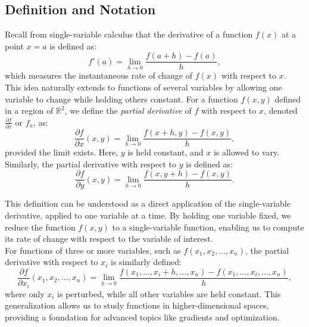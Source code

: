\subsection*{Definition and Notation}

\noindent Recall from single-variable calculus that the derivative of a function \( f(x) \) at a point \( x = a \) is defined as:
\[
f'(a) = \lim_{h \to 0} \frac{f(a + h) - f(a)}{h},
\]
which measures the instantaneous rate of change of \( f(x) \) with respect to \( x \). This idea naturally extends to functions of several variables by allowing one variable to change while holding others constant. For a function \( f(x, y) \) defined in a region of \( \mathbb{R}^2 \), we define the \textit{partial derivative} of \( f \) with respect to \( x \), denoted \( \frac{\partial f}{\partial x} \) or \( f_x \), as:
\[
\frac{\partial f}{\partial x}(x, y) = \lim_{h \to 0} \frac{f(x + h, y) - f(x, y)}{h},
\]
provided the limit exists. Here, \( y \) is held constant, and \( x \) is allowed to vary. Similarly, the partial derivative with respect to \( y \) is defined as:
\[
\frac{\partial f}{\partial y}(x, y) = \lim_{h \to 0} \frac{f(x, y + h) - f(x, y)}{h}.
\]

\noindent This definition can be understood as a direct application of the single-variable derivative, applied to one variable at a time. By holding one variable fixed, we reduce the function \( f(x, y) \) to a single-variable function, enabling us to compute its rate of change with respect to the variable of interest. \\

\noindent For functions of three or more variables, such as \( f(x_1, x_2, \ldots, x_n) \), the partial derivative with respect to \( x_i \) is similarly defined:
\[
\frac{\partial f}{\partial x_i}(x_1, x_2, \ldots, x_n) = \lim_{h \to 0} \frac{f(x_1, \ldots, x_i + h, \ldots, x_n) - f(x_1, \ldots, x_i, \ldots, x_n)}{h},
\]
where only \( x_i \) is perturbed, while all other variables are held constant. This generalization allows us to study functions in higher-dimensional spaces, providing a foundation for advanced topics like gradients and optimization. 


